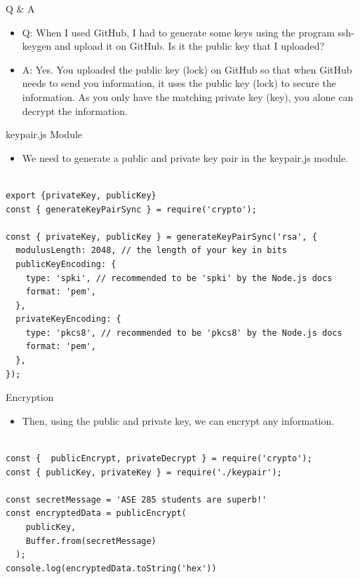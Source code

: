 \begin{frame}[fragile]{Q \& A}

\begin{itemize}
	\item Q: When I used GitHub, I had to generate some keys using the program ssh-keygen and upload it on GitHub. Is it the public key that I uploaded?
	\item A: Yes. You uploaded the public key (lock) on GitHub so that when GitHub needs to send you information, it uses the public key (lock) to secure the information. As you only have the matching private key (key), you alone can decrypt the information. 
\end{itemize}

\end{frame}

\begin{frame}[fragile]{keypair.js Module}

\begin{itemize}
	\item We need to generate a public and private key pair in the keypair.js module. 
\end{itemize}

\begin{Code}{}%
\begin{lstlisting}[firstnumber=1, label=glabels, xleftmargin=0pt, basicstyle=\tiny]% 

export {privateKey, publicKey}
const { generateKeyPairSync } = require('crypto');

const { privateKey, publicKey } = generateKeyPairSync('rsa', {
  modulusLength: 2048, // the length of your key in bits
  publicKeyEncoding: {
    type: 'spki', // recommended to be 'spki' by the Node.js docs
    format: 'pem',
  },
  privateKeyEncoding: {
    type: 'pkcs8', // recommended to be 'pkcs8' by the Node.js docs
    format: 'pem',
  },
});
\end{lstlisting}%
\end{Code}%

\end{frame}

\begin{frame}[fragile]{Encryption}

\begin{itemize}
	\item Then, using the public and private key, we can encrypt any information. 
\end{itemize}

\begin{Code}{}%
\begin{lstlisting}[firstnumber=1, label=glabels, xleftmargin=0pt, basicstyle=\scriptsize]% 

const {  publicEncrypt, privateDecrypt } = require('crypto');
const { publicKey, privateKey } = require('./keypair');

const secretMessage = 'ASE 285 students are superb!'
const encryptedData = publicEncrypt(
    publicKey,
    Buffer.from(secretMessage)
  );
console.log(encryptedData.toString('hex'))
\end{lstlisting}%
\end{Code}%

\end{frame}

